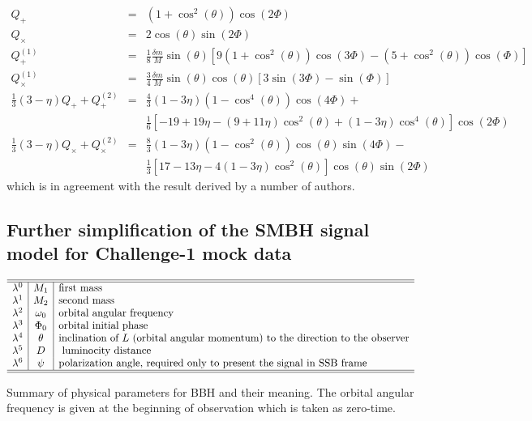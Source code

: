\documentclass[11pt]{report}
\def\bea{\begin{eqnarray}}
\def\ena{\end{eqnarray}}
\begin{document}
\bea
Q_{+} &=& (1+\cos^2(\theta))\cos(2\Phi)\\
Q_{\times} &=& 2\cos(\theta)\sin(2\Phi)\\
Q^{(1)}_{+} &=& \frac1{8}\frac{\delta m}{M}\sin(\theta)
\left[ 9(1+\cos^2(\theta))\cos(3\Phi) - (5+\cos^2(\theta))\cos(\Phi) \right]\\
Q^{(1)}_{\times} &=& \frac3{4} \frac{\delta m}{M}\sin(\theta)
\cos(\theta)\left[ 3\sin(3\Phi) - \sin(\Phi) \right]\\
\frac1{3}(3-\eta)Q_{+} + Q^{(2)}_{+} &=& \frac4{3} (1-3\eta)
(1-\cos^4(\theta))\cos(4\Phi) + \nonumber \\
& &\frac1{6}\left[ -19 + 19\eta -(9 + 11\eta)\cos^2(\theta) + (1-3\eta)\cos^4(\theta)\right] \cos(2\Phi)\\
\frac1{3}(3-\eta)Q_{\times} + Q^{(2)}_{\times} &=&
\frac8{3}(1-3\eta)(1-\cos^2(\theta))\cos(\theta)\sin(4\Phi) - 
\nonumber \\
& &\frac1{3}\left[ 17  -13\eta -4(1-3\eta)\cos^2(\theta)
 \right]\cos(\theta)\sin(2\Phi)
\ena
which is in agreement with the result derived by a number of authors.


\subsection{Further simplification of the SMBH signal model for Challenge-1 mock data}\label{smbh-ch1}




\begin{table}
\centerline{$\begin{array}{c|c|l}\hline\hline
\lambda^0 & M_1     & \text{first mass}   \\
\lambda^1 & M_2        & \text{second mass}\\
\lambda^2 & \omega_0        & \text {orbital angular frequency}\\
\lambda^3 & \Phi_0         & \text{orbital initial phase} \\
\lambda^4 & \theta          & \text{inclination of $L$ (orbital 
angular momentum) to the direction to the 
observer} \\
\lambda^5 & D &  \text{ luminocity distance}      \\
\lambda^6 & \psi          & \text{polarization angle, required 
only to present the signal in SSB frame}\\
\hline\hline
\end{array}$}
\caption{\protect\footnotesize
Summary of physical parameters for BBH and their meaning.
The orbital angular frequency is given at the beginning
of observation which is taken as zero-time.
}\label{tableBBH}
\end{table}
\end{document}
